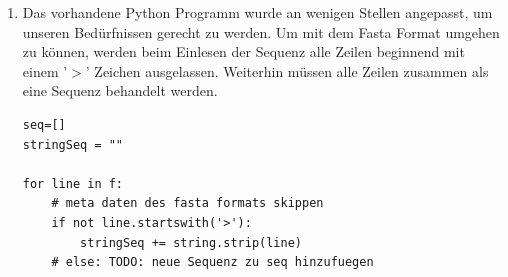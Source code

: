 \documentclass{homework}
\date{Montag, dem 10. Dezember 2012}
\author{Stefan Meißner (4279113) und Niels Hoppe (4356370)}
\begin{document}
\maketitle
\begin{enumerate} 


%
%
%
%
%
%
%
%
%
%
\begin{enumerate}
\item Das vorhandene Python Programm wurde an wenigen Stellen angepasst, um unseren Bedürfnissen gerecht zu werden. Um mit dem Fasta Format umgehen zu können, werden beim Einlesen der Sequenz alle Zeilen beginnend mit einem '$>$' Zeichen ausgelassen. 
Weiterhin müssen alle Zeilen zusammen als eine Sequenz behandelt werden.
\begin{verbatim}
seq=[]
stringSeq = ""

for line in f:
    # meta daten des fasta formats skippen
    if not line.startswith('>'):
        stringSeq += string.strip(line)
    # else: TODO: neue Sequenz zu seq hinzufuegen


\end{verbatim}
\end{enumerate}
\end{enumerate}
\end{document}
